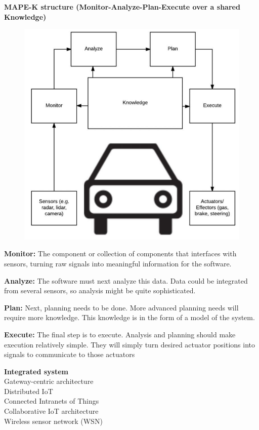 \textbf{MAPE-K structure (Monitor-Analyze-Plan-Execute over a shared Knowledge)}
\begin{figure}[ht!]
\centering
\includegraphics[width=.6\textwidth]{oborove/SWA/img/mapek.png}
\end{figure}

\textbf{Monitor:} The component or collection of components that interfaces with sensors, turning raw signals into meaningful information for the software.

\textbf{Analyze:} The software must next analyze this data. Data could be integrated from several sensors, so analysis might be quite sophisticated.

\textbf{Plan:} Next, planning needs to be done. More advanced planning needs will require more knowledge. This knowledge is in the form of a model of the system.

\textbf{Execute:}  The final step is to execute. Analysis and planning should make execution relatively simple. They will simply turn desired actuator positions into signals to communicate to those actuators

\textbf{Integrated system}\\
Gateway-centric architecture\\
Distributed IoT\\
Connected Intranets of Things\\
Collaborative IoT architecture\\
Wireless sensor network (WSN)